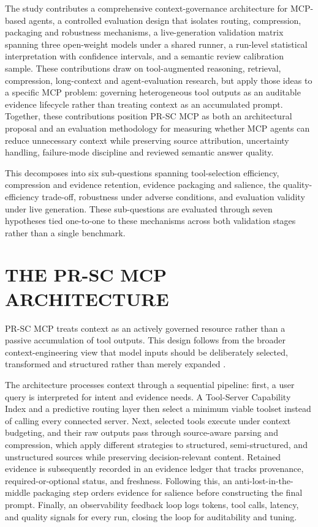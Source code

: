 The study contributes a comprehensive context-governance architecture for MCP-based agents, a controlled evaluation design that isolates routing, compression, packaging and robustness mechanisms, a live-generation validation matrix spanning three open-weight models under a shared runner, a run-level statistical interpretation with confidence intervals, and a semantic review calibration sample. These contributions draw on tool-augmented reasoning, retrieval, compression, long-context and agent-evaluation research, but apply those ideas to a specific MCP problem: governing heterogeneous tool outputs as an auditable evidence lifecycle rather than treating context as an accumulated prompt. Together, these contributions position PR-SC MCP as both an architectural proposal and an evaluation methodology for measuring whether MCP agents can reduce unnecessary context while preserving source attribution, uncertainty handling, failure-mode discipline and reviewed semantic answer quality.

This decomposes into six sub-questions spanning tool-selection efficiency, compression and evidence retention, evidence packaging and salience, the quality-efficiency trade-off, robustness under adverse conditions, and evaluation validity under live generation. These sub-questions are evaluated through seven hypotheses tied one-to-one to these mechanisms across both validation stages rather than a single benchmark.

\section{THE PR-SC MCP ARCHITECTURE}

PR-SC MCP treats context as an actively governed resource rather than a passive accumulation of tool outputs. This design follows from the broader context-engineering view that model inputs should be deliberately selected, transformed and structured rather than merely expanded \cite{Mei2025}.

The architecture processes context through a sequential pipeline: first, a user query is interpreted for intent and evidence needs. A Tool-Server Capability Index and a predictive routing layer then select a minimum viable toolset instead of calling every connected server. Next, selected tools execute under context budgeting, and their raw outputs pass through source-aware parsing and compression, which apply different strategies to structured, semi-structured, and unstructured sources while preserving decision-relevant content. Retained evidence is subsequently recorded in an evidence ledger that tracks provenance, required-or-optional status, and freshness. Following this, an anti-lost-in-the-middle packaging step orders evidence for salience before constructing the final prompt. Finally, an observability feedback loop logs tokens, tool calls, latency, and quality signals for every run, closing the loop for auditability and tuning.

